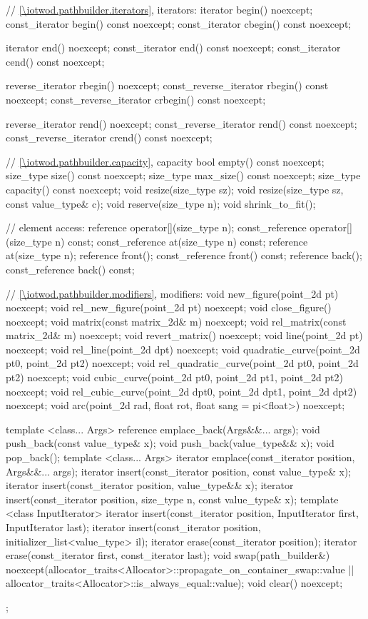 \begin{codeblock}
{{    // \ref{\iotwod.pathbuilder.iterators}, iterators:
    iterator begin() noexcept;
    const_iterator begin() const noexcept;
    const_iterator cbegin() const noexcept;

    iterator end() noexcept;
    const_iterator end() const noexcept;
    const_iterator cend() const noexcept;
    
    reverse_iterator rbegin() noexcept;
    const_reverse_iterator rbegin() const noexcept;
    const_reverse_iterator crbegin() const noexcept;

    reverse_iterator rend() noexcept;
    const_reverse_iterator rend() const noexcept;
    const_reverse_iterator crend() const noexcept;
    
    // \ref{\iotwod.pathbuilder.capacity}, capacity
    bool empty() const noexcept;
    size_type size() const noexcept;
    size_type max_size() const noexcept;
    size_type capacity() const noexcept;
    void resize(size_type sz);
    void resize(size_type sz, const value_type& c);
    void reserve(size_type n);
    void shrink_to_fit();

    // element access:
    reference operator[](size_type n);
    const_reference operator[](size_type n) const;
    const_reference at(size_type n) const;
    reference at(size_type n);
    reference front();
    const_reference front() const;
    reference back();
    const_reference back() const;

    // \ref{\iotwod.pathbuilder.modifiers}, modifiers:
    void new_figure(point_2d pt) noexcept;
    void rel_new_figure(point_2d pt) noexcept;
    void close_figure() noexcept;
    void matrix(const matrix_2d& m) noexcept;
    void rel_matrix(const matrix_2d& m) noexcept;
    void revert_matrix() noexcept;
    void line(point_2d pt) noexcept;
    void rel_line(point_2d dpt) noexcept;
    void quadratic_curve(point_2d pt0, point_2d pt2)
      noexcept;
    void rel_quadratic_curve(point_2d pt0, point_2d pt2)
      noexcept;
    void cubic_curve(point_2d pt0, point_2d pt1,
      point_2d pt2) noexcept;
    void rel_cubic_curve(point_2d dpt0, point_2d dpt1,
      point_2d dpt2) noexcept;
    void arc(point_2d rad, float rot, float sang = pi<float>)
      noexcept;
    
    template <class... Args>
    reference emplace_back(Args&&... args);
    void push_back(const value_type& x);
    void push_back(value_type&& x);
    void pop_back();
    template <class... Args>
    iterator emplace(const_iterator position, Args&&... args);
    iterator insert(const_iterator position, const value_type& x);
    iterator insert(const_iterator position, value_type&& x);
    iterator insert(const_iterator position, size_type n, const value_type& x);
    template <class InputIterator>
    iterator insert(const_iterator position, InputIterator first,
      InputIterator last);
    iterator insert(const_iterator position,
      initializer_list<value_type> il);
    iterator erase(const_iterator position);
    iterator erase(const_iterator first, const_iterator last);
    void swap(path_builder&)
      noexcept(allocator_traits<Allocator>::propagate_on_container_swap::value 
        || allocator_traits<Allocator>::is_always_equal::value);
    void clear() noexcept;
  };
  
}
\end{codeblock}
